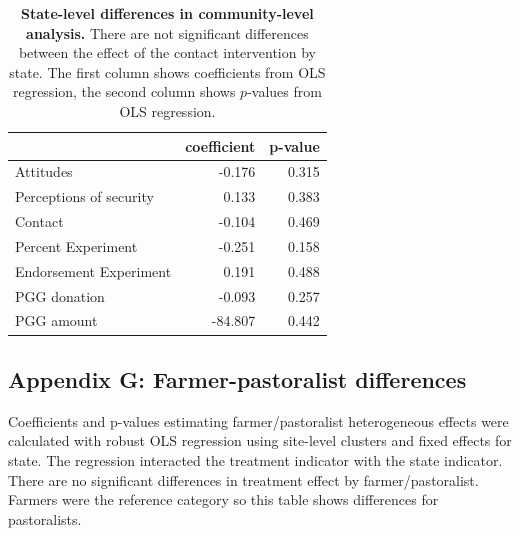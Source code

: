\documentclass[
]{article}
\begin{document}
\begin{table}[H]
\begin{center}
\label{tab:state_tab}
\caption{\textbf{State-level differences in community-level analysis.} There are not significant differences between the effect of the contact intervention by state. The first column shows coefficients from OLS regression, the second column shows $p$-values from OLS regression.}
\smallskip

\begin{tabular}{l|r|r}
\hline
  & coefficient & p-value\\
\hline
Attitudes & -0.176 & 0.315\\
\hline
Perceptions of security & 0.133 & 0.383\\
\hline
Contact & -0.104 & 0.469\\
\hline
Percent Experiment & -0.251 & 0.158\\
\hline
Endorsement Experiment & 0.191 & 0.488\\
\hline
PGG donation & -0.093 & 0.257\\
\hline
PGG amount & -84.807 & 0.442\\
\hline
\end{tabular}


\end{center}
\end{table}

\hypertarget{appendix-g-farmer-pastoralist-differences}{%
\subsection{Appendix G: Farmer-pastoralist
differences}\label{appendix-g-farmer-pastoralist-differences}}

Coefficients and p-values estimating farmer/pastoralist heterogeneous
effects were calculated with robust OLS regression using site-level
clusters and fixed effects for state. The regression interacted the
treatment indicator with the state indicator. There are no significant
differences in treatment effect by farmer/pastoralist. Farmers were the
reference category so this table shows differences for pastoralists.
\end{document}

